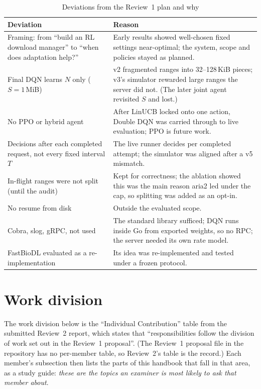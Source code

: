 \begin{table}[H]\centering\small
\caption{Deviations from the Review~1 plan and why}\label{tab:deviations}
\begin{tabularx}{\linewidth}{@{}P{4.4cm}L@{}}
\toprule
\textbf{Deviation} & \textbf{Reason}\\
\midrule
Framing: from ``build an RL download manager'' to ``when does adaptation help?'' & Early results showed well-chosen fixed settings near-optimal; the system, scope and policies stayed as planned.\\
Final DQN learns $N$ only ($S=1$\,MiB) & v2 fragmented ranges into 32--128\,KiB pieces; v3's simulator rewarded large ranges the server did not. (The later joint agent revisited $S$ and lost.)\\
No PPO or hybrid agent & After LinUCB locked onto one action, Double DQN was carried through to live evaluation; PPO is future work.\\
Decisions after each completed request, not every fixed interval $T$ & The live runner decides per completed attempt; the simulator was aligned after a v5 mismatch.\\
In-flight ranges were not split (until the audit) & Kept for correctness; the ablation showed this was the main reason aria2 led under the cap, so splitting was added as an opt-in.\\
No resume from disk & Outside the evaluated scope.\\
Cobra, slog, gRPC,  not used & The standard library sufficed; DQN runs inside Go from exported weights, so no RPC; the server needed its own rate model.\\
FastBioDL evaluated as a re-implementation & Its idea was re-implemented and tested under a frozen protocol.\\
\bottomrule
\end{tabularx}
\end{table}

\section{Work division}\label{sec:work}
The work division below is the ``Individual Contribution'' table from the submitted Review~2 report, which states that ``responsibilities follow the division of work set out in the Review~1 proposal''. (The Review~1 proposal file in the repository has no per-member table, so Review~2's table is the record.) Each member's subsection then lists the parts of this handbook that fall in that area, as a study guide: \emph{these are the topics an examiner is most likely to ask that member about}.

